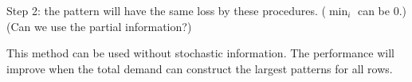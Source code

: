Step 2: the pattern will have the same loss by these procedures. ($\min_i$ can be 0.)
(Can we use the partial information?)


This method can be used without stochastic information. The performance will improve when the total demand can construct the largest patterns for all rows.









